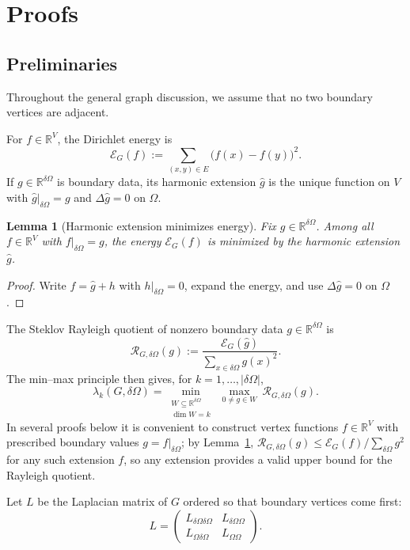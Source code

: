 \documentclass[11pt]{article}
\newtheorem{lemma}[theorem]{Lemma}
\theoremstyle{definition}
\theoremstyle{remark}
\newcommand{\RR}{\mathbb{R}}
\newcommand{\dO}{\delta\Omega}
\newcommand{\Om}{\Omega}
\begin{document}
\section{Proofs}\label{sec:proofs}

\subsection{Preliminaries}\label{subsec:prelim}
Throughout the general graph discussion, we assume that no two boundary vertices are adjacent.

For $f\in\RR^V$, the Dirichlet energy is
\[
\mathcal{E}_G(f):=\sum_{(x,y)\in E}\bigl(f(x)-f(y)\bigr)^2.
\]
If $g\in\RR^{\dO}$ is boundary data, its harmonic extension $\widehat{g}$ is the unique function on $V$ with $\widehat{g}|_{\dO}=g$ and $\Delta\widehat{g}=0$ on $\Om$.

\begin{lemma}[Harmonic extension minimizes energy]\label{lem:harmmin}
Fix $g\in\RR^{\dO}$.
Among all $f\in\RR^V$ with $f|_{\dO}=g$, the energy $\mathcal{E}_G(f)$ is minimized by the harmonic extension $\widehat{g}$.
\end{lemma}

\begin{proof}
Write $f=\widehat{g}+h$ with $h|_{\dO}=0$, expand the energy, and use $\Delta\widehat{g}=0$ on $\Om$.
\end{proof}

The Steklov Rayleigh quotient of nonzero boundary data $g\in\RR^{\dO}$ is
\begin{equation}\label{eq:rayleigh}
\mathcal{R}_{G,\dO}(g):=\frac{\mathcal{E}_G(\widehat{g})}{\sum_{x\in\dO}g(x)^2}.
\end{equation}
The min--max principle then gives, for $k=1,\dots,|\dO|$,
\begin{equation}\label{eq:minmax_formal}
\lambda_k(G,\dO)=\min_{\substack{W\subseteq\RR^{\dO}\\\dim W=k}}\ \max_{0\neq g\in W}\ \mathcal{R}_{G,\dO}(g).
\end{equation}
In several proofs below it is convenient to construct vertex functions $f\in\RR^V$ with prescribed boundary values $g=f|_{\dO}$;
by Lemma~\ref{lem:harmmin}, $\mathcal{R}_{G,\dO}(g)\le \mathcal{E}_G(f)/\sum_{\dO}g^2$ for any such extension $f$, so any extension provides a valid upper bound for the Rayleigh quotient.

Let $L$ be the Laplacian matrix of $G$ ordered so that boundary vertices come first:
\[
L=\begin{pmatrix}
L_{\dO\dO} & L_{\dO\Om}\\[2pt]
L_{\Om\dO} & L_{\Om\Om}
\end{pmatrix}.
\]
\end{document}
